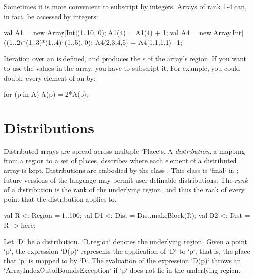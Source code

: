 Sometimes it is more convenient to subscript by integers.  Arrays of rank 1-4
can, in fact, be accessed by integers: 
\begin{xten}
val A1 = new Array[Int](1..10, 0);
A1(4) = A1(4) + 1;
val A4 = new Array[Int]((1..2)*(1..3)*(1..4)*(1..5), 0);
A4(2,3,4,5) = A4(1,1,1,1)+1;
\end{xten}



Iteration over an  is defined, and produces the s of the
array's region.  If you want to use the values in the array, you have to
subscript it.  For example, you could double every element of an
 by: 
\begin{xten}
for (p in A) A(p) = 2*A(p);
\end{xten}



\section{Distributions}\label{XtenDistributions}

Distributed arrays are spread across multiple \xcd`Place`s.  
A {\em distribution}, a mapping from a region to a set of places, 
describes where each element of a distributed array is kept.
Distributions are embodied by the class .
This class is \xcd`final` in
{}\XtenCurrVer; future versions of the language may permit
user-definable distributions. 
The {\em rank} of a distribution is the rank of the underlying region, and
thus the rank of every point that the distribution applies to.



\begin{xten}
val R  <: Region = 1..100;
val D1 <: Dist = Dist.makeBlock(R);
val D2 <: Dist = R -> here;
\end{xten}

Let \xcd`D` be a distribution. 
\xcd`D.region` 
denotes the underlying
region. 
Given a point \xcd`p`, the expression
\xcd`D(p)` represents the application of \xcd`D` to \xcd`p`, that is,
the place that \xcd`p` is mapped to by \xcd`D`. The evaluation of the
expression \xcd`D(p)` throws an \xcd`ArrayIndexOutofBoundsException`
if \xcd`p` does not lie in the underlying region.


